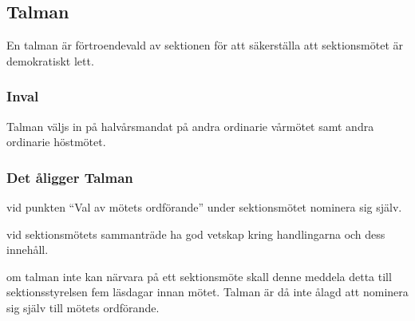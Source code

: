 \subsection{Talman}
En talman är förtroendevald av sektionen för att säkerställa att sektionsmötet är demokratiskt lett. 

\subsubsection{Inval}
Talman väljs in på halvårsmandat på andra ordinarie vårmötet samt andra ordinarie höstmötet.
\subsubsection{Det åligger Talman}
\begin{att}
  \item vid punkten ``Val av mötets ordförande'' under sektionsmötet nominera sig själv.
  \item vid sektionsmötets sammanträde ha god vetskap kring handlingarna och dess innehåll.
  \item om talman inte kan närvara på ett sektionsmöte skall denne meddela detta till sektionsstyrelsen fem läsdagar innan mötet. Talman är då inte ålagd att nominera sig själv till mötets ordförande.
\end{att}